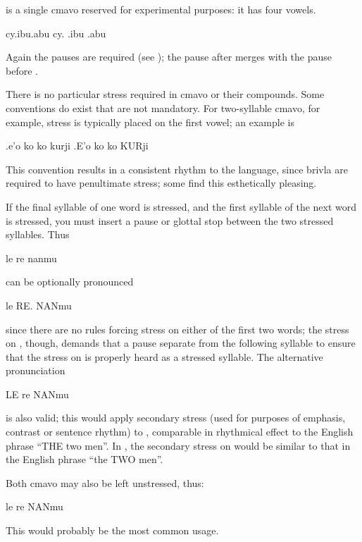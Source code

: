 {\noindent}is a single cmavo reserved for experimental purposes: it has four vowels.
\begin{example}
cy.ibu.abu\n
cy. .ibu .abu
\end{example}

Again the pauses are required (see ); the pause after  merges with the pause before .

There is no particular stress required in cmavo or their compounds. Some conventions do exist that are not mandatory. For two-syllable cmavo, for example, stress is typically placed on the first vowel; an example is
\begin{example}
.e'o ko ko kurji\n
.E'o ko ko KURji
\end{example}

This convention results in a consistent rhythm to the language, since brivla are required to have penultimate stress; some find this esthetically pleasing.

If the final syllable of one word is stressed, and the first syllable of the next word is stressed, you must insert a pause or glottal stop between the two stressed syllables. Thus
\begin{example}
le re nanmu
\end{example}

{\noindent}can be optionally pronounced
\begin{example}
le RE. NANmu
\end{example}

{\noindent}since there are no rules forcing stress on either of the first two words; the stress on , though, demands that a pause separate  from the following syllable  to ensure that the stress on  is properly heard as a stressed syllable. The alternative pronunciation
\begin{example}
LE re NANmu
\end{example}

{\noindent}is also valid; this would apply secondary stress (used for purposes of emphasis, contrast or sentence rhythm) to , comparable in rhythmical effect to the English phrase ``THE two men''. In , the secondary stress on  would be similar to that in the English phrase ``the TWO men''. 

Both cmavo may also be left unstressed, thus:
\begin{example}
le re NANmu
\end{example}

This would probably be the most common usage.



